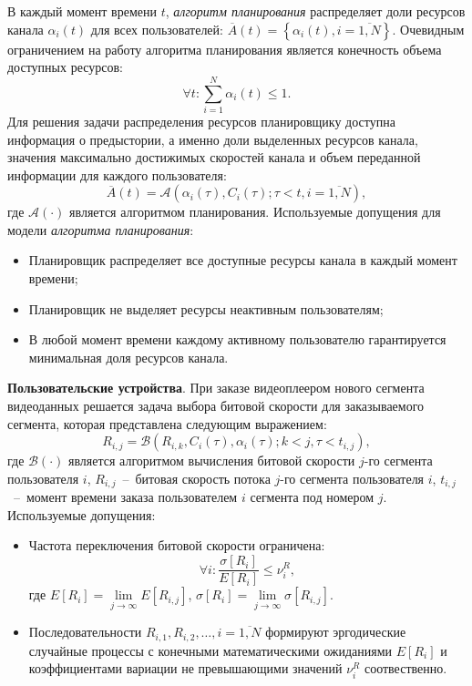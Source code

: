 В каждый момент времени $t$, \textit{алгоритм планирования} распределяет доли ресурсов канала $\alpha_i(t)$ для всех пользователей:  $\overline{A}(t) = \left\{\alpha_{i}(t), i = \overline{1,N}\right\}$. Очевидным ограничением на работу алгоритма планирования является конечность объема доступных ресурсов:
$$\forall t: \sum\limits_{i=1}^{N}\alpha_{i}(t) \leq 1.$$
Для решения задачи распределения ресурсов планировщику доступна информация о предыстории, а именно доли выделенных ресурсов канала, значения максимально достижимых скоростей канала и объем переданной информации для каждого пользователя:
\begin{equation}
\nonumber
\overline{A}(t) = \mathcal{A}\left( \alpha_i(\tau), C_i(\tau);\tau<t, i=\overline{1,N} \right),
\label{eq:SchedulingRule}
\end{equation}
где $\mathcal{A}\left(\cdot\right)$ является алгоритмом планирования.
\newline
Используемые допущения для модели \textit{алгоритма планирования}:
\begin{itemize}
	\item Планировщик распределяет все доступные ресурсы канала в каждый момент времени;
	\item Планировщик не выделяет ресурсы неактивным пользователям;
	\item В любой момент времени каждому активному пользователю гарантируется минимальная доля ресурсов канала.
\end{itemize}

\textbf{Пользовательские устройства}. При заказе видеоплеером нового сегмента видеоданных решается задача выбора битовой скорости для заказываемого сегмента, которая представлена следующим выражением:
\begin{equation}
\nonumber
R_{i,j} = \mathcal{B}\left(R_{i,k}, C_i(\tau), \alpha_i(\tau); k < j, \tau<t_{i,j} \right),
\end{equation}
где $\mathcal{B}\left(\cdot\right)$ является алгоритмом вычисления битовой скорости $j$-го сегмента пользователя $i$, $R_{i,j}$~--~битовая скорость потока $j$-го сегмента пользователя $i$, $t_{i,j}$~--~момент времени заказа пользователем $i$ сегмента под номером $j$.
\newline
Используемые допущения:
\begin{itemize}
	\item Частота переключения битовой скорости ограничена:
	\begin{equation}
	\nonumber
	\forall i: \frac{ \sigma\left[R_{i}\right] }{ E\left[R_{i}\right]} \leq \nu^R_i,
	\label{eq:SwitchRatio}
	\end{equation}
	где $E[R_i] = \lim\limits_{j \rightarrow \infty}E[R_{i,j}]$, $\sigma\left[R_{i}\right] = \lim\limits_{j \rightarrow \infty}\sigma\left[R_{i,j}\right]$.
	\item Последовательности $R_{i,1}, R_{i,2}, \ldots, i=\overline{1,N}$ формируют эргодические случайные процессы с конечными математическими ожиданиями $E[R_{i}]$ и коэффициентами вариации не превышающими значений $\nu^R_i$ соотвественно.
\end{itemize}

